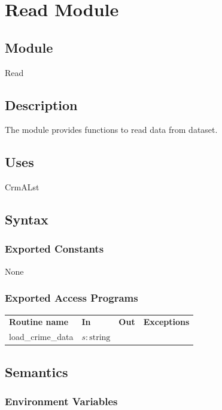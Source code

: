 \documentclass[12pt]{article}
\begin{document}
\newpage

\section* {Read Module}

\subsection* {Module}

Read

\subsection* {Description}
The module provides functions to read data from dataset.

\subsection* {Uses}

CrmALst

\subsection* {Syntax}

\subsubsection* {Exported Constants}

None

\subsubsection* {Exported Access Programs}

\begin{tabular}{| l | l | l | l |}
\hline
\textbf{Routine name} & \textbf{In} & \textbf{Out} & \textbf{Exceptions}\\
load\_crime\_data & $s: \mbox{string}$ & ~ & ~\\
\hline
\end{tabular}

\subsection* {Semantics}

\subsubsection* {Environment Variables}
\end{document}
